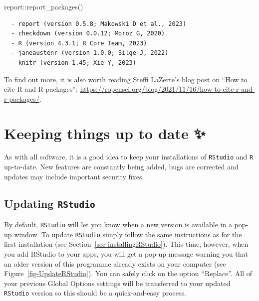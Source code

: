 \documentclass[
  letterpaper,
  DIV=11,
  numbers=noendperiod]{scrreprt}
\newenvironment{Shaded}{\begin{snugshade}}{\end{snugshade}}
\newcommand{\FunctionTok}[1]{\textcolor[rgb]{0.28,0.35,0.67}{#1}}
\newcommand{\NormalTok}[1]{\textcolor[rgb]{0.00,0.23,0.31}{#1}}
\newcommand{\SpecialCharTok}[1]{\textcolor[rgb]{0.37,0.37,0.37}{#1}}
\begin{document}
\begin{tcolorbox}
\begin{Shaded}
\begin{Highlighting}[]
\NormalTok{report}\SpecialCharTok{::}\FunctionTok{report\_packages}\NormalTok{()}
\end{Highlighting}
\end{Shaded}

\begin{verbatim}
  - report (version 0.5.8; Makowski D et al., 2023)
  - checkdown (version 0.0.12; Moroz G, 2020)
  - R (version 4.3.1; R Core Team, 2023)
  - janeaustenr (version 1.0.0; Silge J, 2022)
  - knitr (version 1.45; Xie Y, 2023)
\end{verbatim}

To find out more, it is also worth reading Steffi LaZerte's blog post on
``How to cite R and R packages'':
\url{https://ropensci.org/blog/2021/11/16/how-to-cite-r-and-r-packages/}.

\end{tcolorbox}

\section{Keeping things up to date ✨}\label{keeping-things-up-to-date}

As with all software, it is a good idea to keep your installations of
\texttt{RStudio} and \texttt{R} up-to-date. New features are constantly
being added, bugs are corrected and updates may include important
security fixes.

\subsection{\texorpdfstring{Updating
\texttt{RStudio}}{Updating RStudio}}\label{updating-rstudio}

By default, \texttt{RStudio} will let you know when a new version is
available in a pop-up window. To update \texttt{RStudio} simply follow
the same instructions as for the first installation (see
Section~\ref{sec-installingRStudio}). This time, however, when you add
RStudio to your apps, you will get a pop-up message warning you that an
older version of this programme already exists on your computer (see
Figure~\ref{fig-UpdateRStudio}). You can safely click on the option
``Replace''. All of your previous Global Options settings will be
transferred to your updated \texttt{RStudio} version so this should be a
quick-and-easy process.
\end{document}
